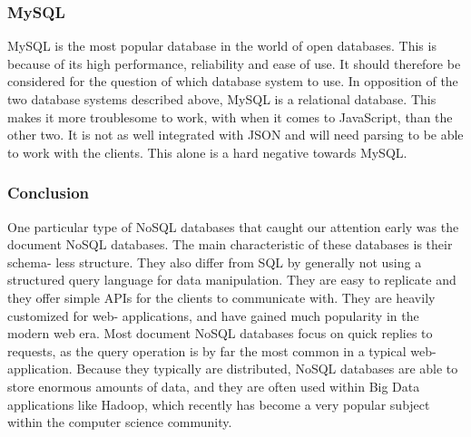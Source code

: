 \subsubsection*{MySQL}
MySQL is the most popular database in the world of open databases. This is because of its high performance, reliability and ease of use. It should therefore be considered for the question of which database system to use. In opposition of the two database systems described above, MySQL is a relational database. This makes it more troublesome to work, with when it comes to JavaScript, than the other two. It is not as well integrated with JSON and will need parsing to be able to work with the clients. This alone is a hard negative towards MySQL.
\cite{mysql-about}





\subsubsection{Conclusion}
One particular type of NoSQL databases that caught our attention early was the document NoSQL databases.
The main characteristic of these databases is their schema- less structure.
They also differ from SQL by generally not using a structured query language for data manipulation.
They are easy to replicate and they offer simple APIs for the clients to communicate with.
They are heavily customized for web- applications, and have gained much popularity in the modern web era.
Most document NoSQL databases focus on quick replies to requests, as the query operation is by far the most common in a typical web- application.
Because they typically are distributed, NoSQL databases are able to store enormous amounts of data, and they are often used within Big Data\cite{bigdata} applications like Hadoop\cite{hadoop}, which recently has become a very popular subject within the computer science community.

